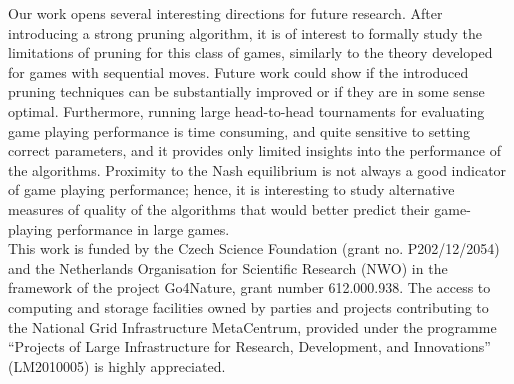 Our work opens several interesting directions for future research. After introducing a strong pruning algorithm, it is of interest to formally study the limitations of pruning for this class of games, similarly to the theory developed for games with sequential moves. Future work could show if the introduced pruning techniques can be substantially improved or if they are in some sense optimal. 
Furthermore, running large head-to-head tournaments for evaluating game playing performance is time consuming, and quite sensitive to setting correct parameters, and it provides only limited insights into the performance of the algorithms. Proximity to the Nash equilibrium is not always a good indicator of game playing performance; hence, it is interesting to study alternative measures of quality of the algorithms that would better predict their game-playing performance in large games. \\

 This work is funded by the Czech Science Foundation (grant no. P202/12/2054) and the Netherlands
Organisation for Scientific Research (NWO) in the framework of the project Go4Nature, grant number 612.000.938.
The access to computing and storage facilities owned by parties and projects contributing to the National Grid
Infrastructure MetaCentrum, provided under the
programme ``Projects of Large Infrastructure for Research, Development, and Innovations'' (LM2010005) is highly appreciated.

